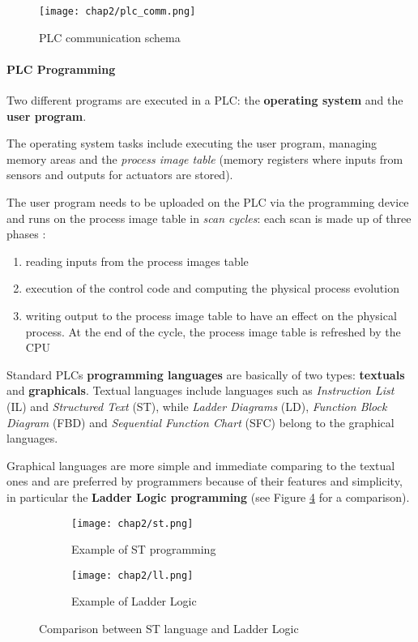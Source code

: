 \begin{figure}[ht]
	\centering
	\texttt{[image: chap2/plc\_comm.png]}
	\caption{PLC communication schema}
	\label{fig:PLC_comm}
\end{figure}

\paragraph{PLC Programming}
\label{subsubsec:2_plc_programming}
Two different programs are executed in a PLC: the \textbf{operating system} and the \textbf{user program}.

\bigskip
The operating system tasks include executing the user program, managing memory areas and the \textit{process image table} (memory registers where inputs from sensors and outputs for actuators are stored).

\bigskip
The user program needs to be uploaded on the PLC via the programming device and runs on the process image table in \textit{scan cycles}: each scan is made up of three phases \cite{ceccato}:

\begin{enumerate}
	\item reading inputs from the process images table
	
	\item execution of the control code and computing the physical process evolution
	
	\item writing output to the process image table to have an effect on the physical process. At the end of the cycle, the process image table is refreshed by the CPU
\end{enumerate}

Standard PLCs \textbf{programming languages} are basically of two types: \textbf{textuals} and \textbf{graphicals}.
Textual languages include languages such as \textit{Instruction List} (IL) and \textit{Structured Text} (ST), while \textit{Ladder Diagrams} (LD), \textit{Function Block Diagram} (FBD) and \textit{Sequential Function Chart} (SFC) belong to the graphical languages.

\bigskip
Graphical languages are more simple and immediate comparing to the textual ones and are preferred by programmers because of their features and simplicity, in particular the \textbf{Ladder Logic programming} (see Figure \ref{fig:st_ll_comparison} for a comparison).

\begin{figure}[ht]
	\centering
	\begin{subfigure}{0.47\textwidth}
		\texttt{[image: chap2/st.png]}
		\caption{Example of ST programming}
		\label{subfig:st_example}
	\end{subfigure}
	\hfill
	\begin{subfigure}{0.47\textwidth}
		\texttt{[image: chap2/ll.png]}
		\caption{Example of Ladder Logic}
		\label{subfig:ladder_logic_example}
	\end{subfigure}
	\caption{Comparison between ST language and Ladder Logic}
	\label{fig:st_ll_comparison}
	
\end{figure}

